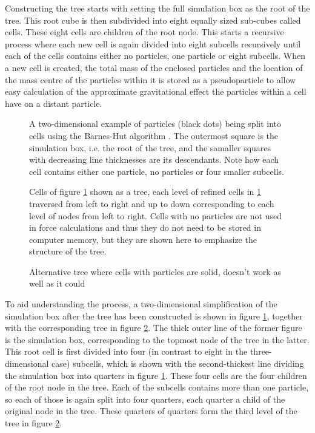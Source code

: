 \documentclass[english, oneside]{HYgradu}
\begin{document}
Constructing the tree starts with setting the full simulation box as the root of the tree. This root cube is then subdivided into eight equally sized sub-cubes called cells. These eight cells are children of the root node. This starts a recursive process where each new cell is again divided into eight subcells recursively until each of the cells contains either no particles, one particle or eight subcells. When a new cell is created, the total mass of the enclosed particles and the location of the mass centre of the particles within it is stored as a pseudoparticle to allow easy calculation of the approximate gravitational effect the particles within a cell have on a distant particle.

\begin{figure}
    \centering
    
    \caption{A two-dimensional example of particles (black dots) being split into cells using the Barnes-Hut algorithm \citep{barnes1986hierarchical}. The outermost square is the simulation box, i.e. the root of the tree, and the samaller squares with decreasing line thicknesses are its descendants. Note how each cell contains either one particle, no particles or four smaller subcells.}\label{fig:tree-box}
\end{figure}
\begin{figure}
    \centering
    \def\svgwidth{\columnwidth}
    
    \caption{Cells of figure \ref{fig:tree-box} shown as a tree, each level of refined cells in \ref{fig:tree-box} traversed from left to right and up to down corresponding to each level of nodes from left to right. Cells with no particles are not used in force calculations and thus they do not need to be stored in computer memory, but they are shown here to emphasize the structure of the tree.}\label{fig:tree}
\end{figure}
\begin{figure}
    \centering
    \def\svgwidth{\columnwidth}
    
    \caption{Alternative tree where cells with particles are solid, doesn't work as well as it could}\label{fig:tree-solids}
\end{figure}

To aid understanding the process, a two-dimensional simplification of the simulation box after the tree has been constructed is shown in figure \ref{fig:tree-box}, together with the corresponding tree in figure \ref{fig:tree}. The thick outer line of the former figure is the simulation box, corresponding to the topmost node of the tree in the latter. This root cell is first divided into four (in contrast to eight in the three-dimensional case) subcells, which is shown with the second-thickest line dividing the simulation box into quarters in figure \ref{fig:tree-box}. These four cells are the four children of the root node in the tree. Each of the subcells contains more than one particle, so each of those is again split into four quarters, each quarter a child of the original node in the tree. These quarters of quarters form the third level of the tree in figure \ref{fig:tree}.
\end{document}
